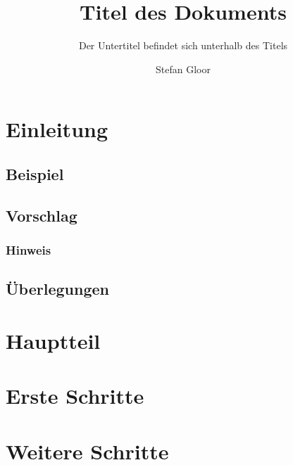 \documentclass[a4paper]{article} %
\title{Titel des Dokuments}
\subtitle{Der Untertitel befindet sich unterhalb des Titels}
\author{Stefan Gloor}
\begin{document}
 
    \thispagestyle{TitlePageStyle} %
    \maketitle %
    

         \section{Einleitung}
             \subsection{Beispiel}
                 \blindtext
            \subsection{Vorschlag}
                \blindtext
                \subsubsection{Hinweis}
                    \blindtext
            \subsection{Überlegungen}
                \blindmathpaper
        \section{Hauptteil}
            \blindtext
        \section{Erste Schritte}
            \blindmathpaper
        \section{Weitere Schritte}
            \blindtext
            
        \blindmathpaper
\end{document}
